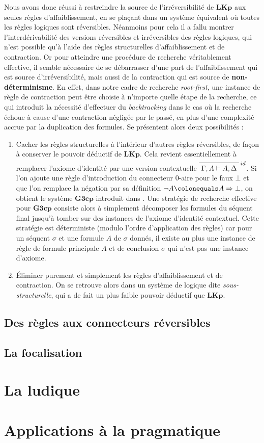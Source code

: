 \documentclass[12pt]{report}
\newcommand{\lto}{\Rightarrow}
\newcommand{\seq}{\vdash}
\newcommand{\irule}[1]{\footnotesize$#1$}
\begin{document}
Nous avons donc réussi à restreindre la source de l'irréversibilité de $\mathbf{LKp}$ aux seules règles d'affaiblissement, en se plaçant dans un système équivalent où toutes les règles logiques sont réversibles. Néanmoins pour cela il a fallu montrer l'interdérivabilité des versions réversibles et irréversibles des règles logiques, qui n'est possible qu'à l'aide des règles structurelles d'affaiblissement et de contraction. Or pour atteindre une procédure de recherche véritablement effective, il semble nécessaire de se débarrasser d'une part de l'affaiblissement qui est source d'irréversibilité, mais aussi de la contraction qui est source de \textbf{non-déterminisme}. En effet, dans notre cadre de recherche \textit{root-first}, une instance de règle de contraction peut être choisie à n'importe quelle étape de la recherche, ce qui introduit la nécessité d'effectuer du \textit{backtracking} dans le cas où la recherche échoue à cause d'une contraction négligée par le passé, en plus d'une complexité accrue par la duplication des formules. Se présentent alors deux possibilités :
\begin{enumerate}
	\item Cacher les règles structurelles à l'intérieur d'autres règles réversibles, de façon à conserver le pouvoir déductif de $\mathbf{LKp}$. Cela revient essentiellement à remplacer l'axiome d'identité par une version contextuelle $\prfbyaxiom{\irule{id}}{\Gamma,A \seq A,\Delta}$. Si l'on ajoute une règle d'introduction du connecteur 0-aire pour le faux $\bot$ et que l'on remplace la négation par sa définition $\neg A \colonequals A \lto \bot$, on obtient le système $\mathbf{G3cp}$ introduit dans \cite{vPN01}. Une stratégie de recherche effective pour $\mathbf{G3cp}$ consiste alors à simplement décomposer les formules du séquent final jusqu'à tomber sur des instances de l'axiome d'identité contextuel. Cette stratégie est déterministe (modulo l'ordre d'application des règles) car pour un séquent $\sigma$ et une formule $A$ de $\sigma$ donnés, il existe au plus une instance de règle de formule principale $A$ et de conclusion $\sigma$ qui n'est pas une instance d'axiome.
	\item Éliminer purement et simplement les règles d'affaiblissement et de contraction. On se retrouve alors dans un système de logique dite \emph{sous-structurelle}, qui a de fait un plus faible pouvoir déductif que $\mathbf{LKp}$.
\end{enumerate}

\section{Des règles aux connecteurs réversibles}

\section{La focalisation}

\chapter{La ludique}

\chapter{Applications à la pragmatique}

\nocite{Tai68}
\nocite{Lec11}
\nocite{Gir03}
\nocite{Gir06}



\end{document}

